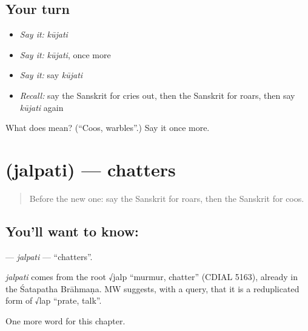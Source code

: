 \subsection*{Your turn}
\begin{itemize}
\raggedright
  \item \emph{Say it:} \emph{kūjati}
  \item \emph{Say it:} \emph{kūjati}, once more
  \item \emph{Say it:} say \emph{kūjati}
  \item \emph{Recall:} say the Sanskrit for cries out, then the Sanskrit for roars, then say \emph{kūjati} again
\end{itemize}

\begin{tcolorbox}[breakable,colback=teal!4,colframe=teal!35!black,title={Before you move on}]
What does  mean? (\textquotedblleft{}Coos, warbles\textquotedblright{}.) Say it once more.
\end{tcolorbox}
\section[\texorpdfstring{\sk{जल्पति} (jalpati)}{जल्पति (jalpati)}]{ (jalpati) — chatters}

\label{lesson:SA-C145-jalpati}



\begin{quote}
Before the new one: say the Sanskrit for roars, then the Sanskrit for coos.
\end{quote}

\subsection*{You'll want to know: }
\textbf{} — \emph{jalpati} — \textquotedblleft{}chatters\textquotedblright{}.

\begin{cousinweb}
\emph{jalpati} comes from the root √jalp \textquotedblleft{}murmur, chatter\textquotedblright{} (CDIAL 5163), already in the Śatapatha Brāhmaṇa. MW suggests, with a query, that it is a reduplicated form of √lap \textquotedblleft{}prate, talk\textquotedblright{}.
\end{cousinweb}

\begin{grammarlens}[title={What you've built}]
One more word for this chapter.
\end{grammarlens}

